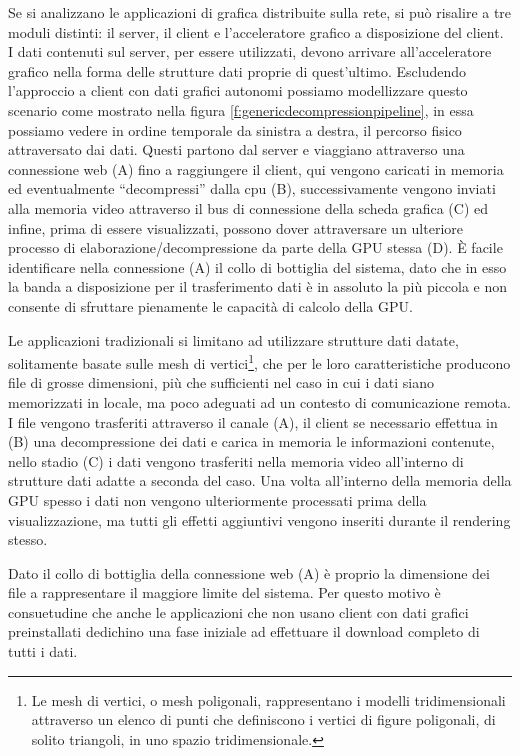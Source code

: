 Se si analizzano le applicazioni di grafica distribuite sulla rete, si pu\`o risalire a tre moduli distinti: il server, il client e l'acceleratore grafico a disposizione del client. I dati contenuti sul server, per essere utilizzati, devono arrivare all'acceleratore grafico nella forma delle strutture dati proprie di quest'ultimo. Escludendo l'approccio a client con dati grafici autonomi possiamo modellizzare questo scenario come mostrato nella figura \ref{f:genericdecompressionpipeline}, in essa possiamo vedere in ordine temporale da sinistra a destra, il percorso fisico attraversato dai dati. Questi partono dal server e viaggiano attraverso una connessione web (A) fino a raggiungere il client, qui vengono caricati in memoria ed eventualmente ``decompressi'' dalla cpu (B), successivamente vengono inviati alla memoria video attraverso il bus di connessione della scheda grafica (C) ed infine, prima di essere visualizzati, possono dover attraversare un ulteriore processo di elaborazione/decompressione da parte della \ac{GPU} stessa (D). \`E facile identificare nella connessione (A) il collo di bottiglia del sistema, dato che in esso la banda a disposizione per il trasferimento dati \`e in assoluto la pi\`u piccola e non consente di sfruttare pienamente le capacit\`a di calcolo della \ac{GPU}.

Le applicazioni tradizionali si limitano ad utilizzare strutture dati datate, solitamente basate sulle mesh di vertici\footnote{Le mesh di vertici, o mesh poligonali, rappresentano i modelli tridimensionali attraverso un elenco di punti che definiscono i vertici di figure poligonali, di solito triangoli, in uno spazio tridimensionale.}, che per le loro caratteristiche producono file di grosse dimensioni, pi\`u che sufficienti nel caso in cui i dati siano memorizzati in locale, ma poco adeguati ad un contesto di comunicazione remota. I file vengono trasferiti attraverso il canale (A), il client se necessario effettua in (B) una decompressione dei dati e carica in memoria le informazioni contenute, nello stadio (C) i dati vengono trasferiti nella memoria video all'interno di strutture dati adatte a seconda del caso. Una volta all'interno della memoria della \ac{GPU} spesso i dati non vengono ulteriormente processati prima della visualizzazione, ma tutti gli effetti aggiuntivi vengono inseriti durante il rendering stesso.

Dato il collo di bottiglia della connessione web (A) \`e proprio la dimensione dei file a rappresentare il maggiore limite del sistema. Per questo motivo \`e consuetudine che anche le applicazioni che non usano client con dati grafici preinstallati dedichino una fase iniziale ad effettuare il download completo di tutti i dati.

